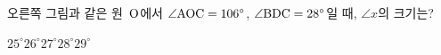\noindent\begin{minipage}[t]{0.58\linewidth}\vspace{0pt}\raggedright 오른쪽 그림과 같은 원~$\mathrm{O}$에서 $\angle\mathrm{AOC}=106^\circ$, $\angle\mathrm{BDC}=28^\circ$일 때, $\angle x$의 크기는?\end{minipage}\hfill\begin{minipage}[t]{0.4\linewidth}\vspace{0pt}\centering \resizebox{\ifdim\width>\linewidth\linewidth\else\width\fi}{!}{}\end{minipage}\par
\begin{choicesii}{$25^\circ$}{$26^\circ$}{$27^\circ$}{$28^\circ$}{$29^\circ$}\end{choicesii}
